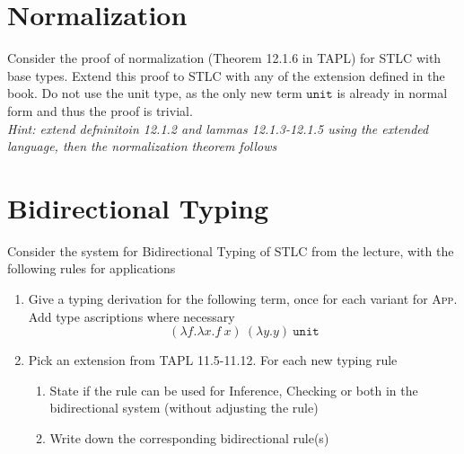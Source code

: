 \section{Normalization}
Consider the proof of normalization (Theorem 12.1.6 in TAPL) for STLC with base types.
Extend this proof to STLC with any of the extension defined in the book. 
Do not use the unit type, as the only new term $\mathtt{unit}$ is already in normal form and thus the proof is trivial.\\
\emph{Hint: extend defninitoin 12.1.2 and lammas 12.1.3-12.1.5 using the extended language, then the normalization theorem follows}

\section{Bidirectional Typing}
Consider the system for Bidirectional Typing of STLC from the lecture, with the following rules for applications
\begin{minipage}{\textwidth}
  \begin{minipage}{0.45\textwidth}
    \begin{prooftree}
    \end{prooftree}
    \hfill
  \end{minipage}
  \begin{minipage}{0.45\textwidth}
    \begin{prooftree}
    \end{prooftree}
    \hfill
  \end{minipage}
  \hfill
  \vspace{2em}
\end{minipage}
\begin{enumerate}
  \item Give a typing derivation for the following term, once for each variant for \textsc{App}. Add type ascriptions where necessary\\
    $$ (\lambda f. \lambda x. f\ x)\ (\lambda y.y)\ \mathtt{unit}$$
  \item Pick an extension from TAPL 11.5-11.12. For each new typing rule
    \begin{enumerate}
      \item State if the rule can be used for Inference, Checking or both in the bidirectional system (without adjusting the rule)
      \item Write down the corresponding bidirectional rule(s)
    \end{enumerate}
\end{enumerate}


